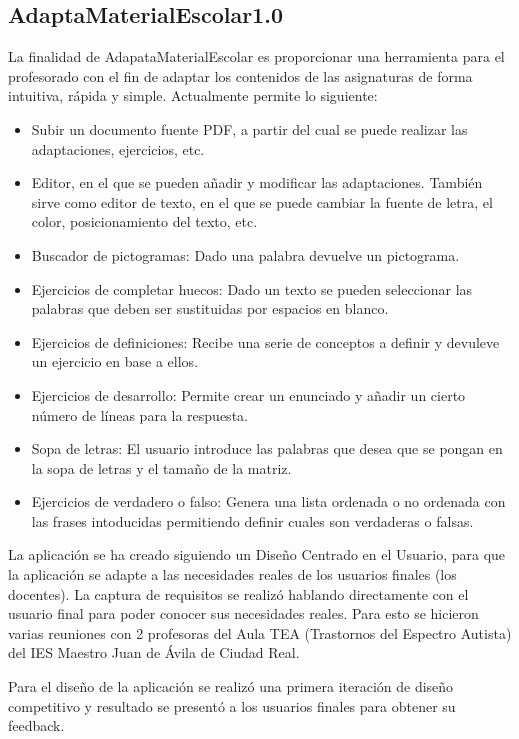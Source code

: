 \subsection{AdaptaMaterialEscolar1.0}\label{cap:adaptaMaterial}
La finalidad de AdapataMaterialEscolar es proporcionar una herramienta para el profesorado con el fin de adaptar los contenidos de las asignaturas de forma intuitiva, rápida y simple. Actualmente permite lo siguiente:
\begin{itemize}
    \item Subir un documento fuente PDF, a partir del cual se puede realizar las adaptaciones, ejercicios, etc.
    \item Editor, en el que se pueden añadir y modificar las adaptaciones. También sirve como editor de texto, en el que se puede cambiar la fuente de letra, el color, posicionamiento del texto, etc.
    \item Buscador de pictogramas: Dado una palabra devuelve un pictograma.
    \item Ejercicios de completar huecos: Dado un texto se pueden seleccionar las palabras que deben ser sustituidas por espacios en blanco.
    \item Ejercicios de definiciones: Recibe una serie de conceptos a definir y devuleve un ejercicio en base a ellos.
    \item Ejercicios de desarrollo: Permite crear un enunciado y añadir un cierto número de líneas para la respuesta.
    \item Sopa de letras: El usuario introduce las palabras que desea que se pongan en la sopa de letras y el tamaño de la matriz.
    \item Ejercicios de verdadero o falso: Genera una lista ordenada o no ordenada con las frases intoducidas permitiendo definir cuales son verdaderas o falsas.
\end{itemize}

La aplicación se ha creado siguiendo un Diseño Centrado en el Usuario, para que la aplicación se adapte a las necesidades reales de los usuarios finales (los docentes). La captura de requisitos se realizó hablando directamente con el usuario final para poder conocer sus necesidades reales. Para esto se hicieron varias reuniones con 2 profesoras del Aula TEA (Trastornos del Espectro Autista) del IES Maestro Juan de Ávila de Ciudad Real.

Para el diseño de la aplicación se realizó una primera iteración de diseño competitivo y resultado se presentó a los usuarios finales para obtener su feedback.

